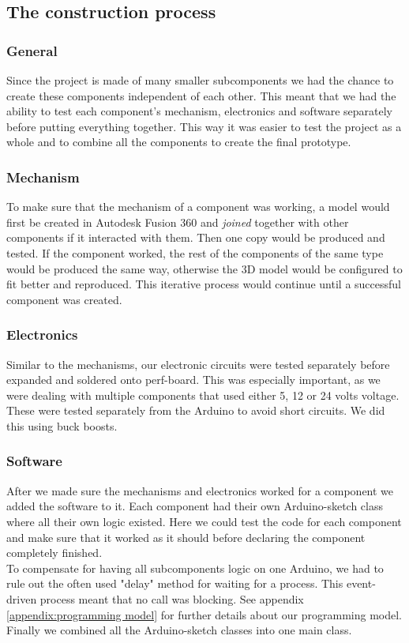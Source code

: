 \subsection{The construction process}
\subsubsection{General}	
Since the project is made of many smaller subcomponents we had the chance to create these components independent of each other. This meant that we had the ability to test each component's mechanism, electronics and software separately before putting everything together. This way it was easier to test the project as a whole and to combine all the components to create the final prototype.\\
\subsubsection{Mechanism}
To make sure that the mechanism of a component was working, a model would first be created in Autodesk Fusion 360 and \textit{joined} together with other components if it interacted with them. Then one copy would be produced and tested. If the component worked, the rest of the components of the same type would be produced the same way, otherwise the 3D model would be configured to fit better and reproduced. This iterative process would continue until a successful component was created.\\
\subsubsection{Electronics}
Similar to the mechanisms, our electronic circuits were tested separately before expanded and soldered onto perf-board.
This was especially important, as we were dealing with multiple components that used either 5, 12 or 24 volts voltage. These were tested separately from the Arduino to avoid short circuits. We did this using buck boosts. 
\subsubsection{Software}
After we made sure the mechanisms and electronics worked for a component we added the software to it. Each component had their own Arduino-sketch class where all their own logic existed. Here we could test the code for each component and make sure that it worked as it should before declaring the component completely finished.
\\
To compensate for having all subcomponents logic on one Arduino, we had to rule out the often used "delay" method for waiting for a process. This event-driven process meant that no call was blocking. See appendix \ref{appendix:programming model} for further details about our programming model.
\\
Finally we combined all the Arduino-sketch classes into one main class.
